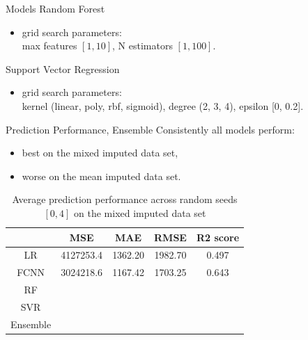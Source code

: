 \documentclass{beamer} %
\begin{document}
\begin{frame}{Models}
  \vspace{-0.5cm}
  Random Forest
  \begin{itemize}
      \item grid search parameters:\\
      max features $[1, 10]$, N estimators $[1, 100]$.
  \end{itemize}
  Support Vector Regression
  \begin{itemize}
      \item grid search parameters:\\
      kernel (linear, poly, rbf, sigmoid), degree (2, 3, 4), epsilon [0, 0.2].
  \end{itemize}
\end{frame}

\begin{frame}{Prediction Performance, Ensemble}
\vspace{-1cm}
 Consistently all models perform:
  \begin{itemize}
      \item best on the mixed imputed data set,
      \item worse on the mean imputed data set.
  \end{itemize}
  \begin{table}[ht!]
    \hspace{-0.7cm}
    \begin{tabular}{|c|c|c|c|c|}
        \hline
        & MSE & MAE & RMSE & R2 score\\
        \hline
        LR & 4127253.4 & 1362.20 & 1982.70 & 0.497 \\
        FCNN & 3024218.6 & 1167.42 & 1703.25 & 0.643 \\
        RF &  &  &  &  \\
        SVR &  &  &  &  \\
        Ensemble &  &  &  &  \\
        \hline
    \end{tabular}
    \caption{Average prediction performance across random seeds $[0, 4]$ on the mixed imputed data set}
    \label{tab:pred_perf}
\end{table}
\end{frame}
\end{document}
